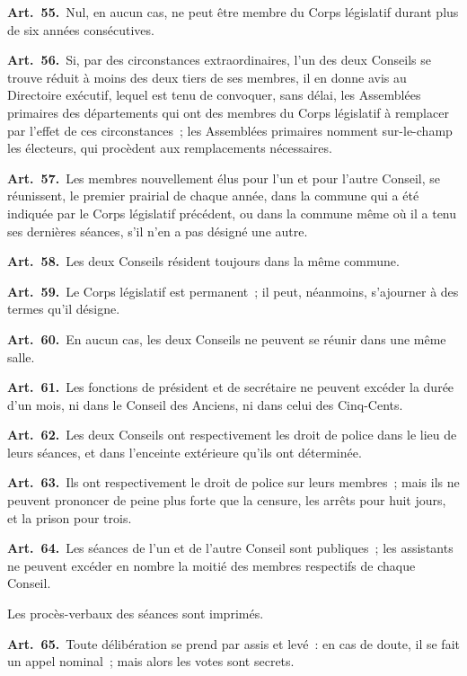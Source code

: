 \documentclass[french,twoside]{book} %
\newcommand{\labelchar}[1]{\textbf{\color{rubric} #1}}
\begin{document}
\labelchar{Art. 55.} Nul, en aucun cas, ne peut être membre du Corps législatif durant plus de six années consécutives.\par
\labelchar{Art. 56.} Si, par des circonstances extraordinaires, l’un des deux Conseils se trouve réduit à moins des deux tiers de ses membres, il en donne avis au Directoire exécutif, lequel est tenu de convoquer, sans délai, les Assemblées primaires des départements qui ont des membres du Corps législatif à remplacer par l’effet de ces circonstances ; les Assemblées primaires nomment sur-le-champ les électeurs, qui procèdent aux remplacements nécessaires.\par
\labelchar{Art. 57.} Les membres nouvellement élus pour l’un et pour l’autre Conseil, se réunissent, le premier prairial de chaque année, dans la commune qui a été indiquée par le Corps législatif précédent, ou dans la commune même où il a tenu ses dernières séances, s’il n’en a pas désigné une autre.\par
\labelchar{Art. 58.} Les deux Conseils résident toujours dans la même commune.\par
\labelchar{Art. 59.} Le Corps législatif est permanent ; il peut, néanmoins, s’ajourner à des termes qu’il désigne.\par
\labelchar{Art. 60.} En aucun cas, les deux Conseils ne peuvent se réunir dans une même salle.\par
\labelchar{Art. 61.} Les fonctions de président et de secrétaire ne peuvent excéder la durée d’un mois, ni dans le Conseil des Anciens, ni dans celui des Cinq-Cents.\par
\labelchar{Art. 62.} Les deux Conseils ont respectivement les droit de police dans le lieu de leurs séances, et dans l’enceinte extérieure qu’ils ont déterminée.\par
\labelchar{Art. 63.} Ils ont respectivement le droit de police sur leurs membres ; mais ils ne peuvent prononcer de peine plus forte que la censure, les arrêts pour huit jours, et la prison pour trois.\par
\labelchar{Art. 64.} Les séances de l’un et de l’autre Conseil sont publiques ; les assistants ne peuvent excéder en nombre la moitié des membres respectifs de chaque Conseil.\par
Les procès-verbaux des séances sont imprimés.\par
\labelchar{Art. 65.} Toute délibération se prend par assis et levé : en cas de doute, il se fait un appel nominal ; mais alors les votes sont secrets.\par
\end{document}
